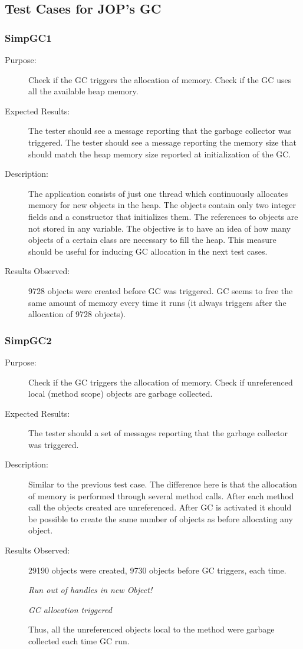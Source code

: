 \subsection{Test Cases for JOP's GC}

\subsubsection{SimpGC1}

\begin{description}
    \item[Purpose:]
Check if the GC triggers the allocation of memory.
Check if the GC uses all the available heap memory.
    \item[Expected Results:]
The tester should see a message reporting that
the garbage collector was triggered. The tester should see a message reporting
the memory size that should match the heap memory size reported at initialization of the
GC.
    \item[Description:]
The application consists of just one thread which continuously
allocates memory for new objects in the heap. The objects contain
only two integer fields and a constructor that initializes them. The
references to objects are not stored in any variable. The objective
is to have an idea of how many objects of a certain class are
necessary to fill the heap. This measure should be useful for
inducing GC allocation in the next test cases.
    \item[Results Observed:]
9728 objects were created before GC was triggered. GC seems to free
the same amount of memory every time it runs (it always triggers
after the allocation of 9728 objects).
\end{description}

\subsubsection{SimpGC2}

\begin{description}
    \item[Purpose:]
Check if the GC triggers the allocation of memory. Check if
unreferenced local (method scope) objects are garbage collected.
    \item[Expected Results:]
The tester should a set of messages reporting that the garbage
collector was triggered.
    \item[Description:]
Similar to the previous test case. The difference here is that the
allocation of memory is performed through several method calls.
After each method call the objects created are unreferenced. After
GC is activated it should be possible to create the same number of
objects as before allocating any object.
    \item[Results Observed:]
29190 objects were created, 9730 objects before GC triggers, each
time.

\emph{Run out of handles in new Object!}

\emph{GC allocation triggered}

Thus, all the unreferenced objects local to the method were garbage
collected each time GC run.

\end{description}

